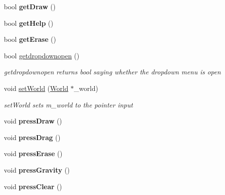 \begin{DoxyCompactItemize}
\item 
\hypertarget{classToolbar_a6a2b3c1096e6fca0096cd925ed4dc683}{bool {\bfseries get\-Draw} ()}\label{classToolbar_a6a2b3c1096e6fca0096cd925ed4dc683}

\item 
\hypertarget{classToolbar_ad857b74648d0d4f2efd6f97db0ee54bb}{bool {\bfseries get\-Help} ()}\label{classToolbar_ad857b74648d0d4f2efd6f97db0ee54bb}

\item 
\hypertarget{classToolbar_aa0f40959ba3b7aa73914493c80e8ea1c}{bool {\bfseries get\-Erase} ()}\label{classToolbar_aa0f40959ba3b7aa73914493c80e8ea1c}

\item 
bool \hyperlink{classToolbar_a999463c6c8f43502c201f36967c2dd74}{getdropdownopen} ()
\begin{DoxyCompactList}\small\item\em getdropdownopen returns bool saying whether the dropdown menu is open \end{DoxyCompactList}\item 
void \hyperlink{classToolbar_af7abc15cc148a86e52fd2b50b6486af3}{set\-World} (\hyperlink{classWorld}{World} $\ast$\-\_\-world)
\begin{DoxyCompactList}\small\item\em set\-World sets m\-\_\-world to the pointer input \end{DoxyCompactList}\item 
\hypertarget{classToolbar_a9ff9b46b71c99272a45bd867a8f67f11}{void {\bfseries press\-Draw} ()}\label{classToolbar_a9ff9b46b71c99272a45bd867a8f67f11}

\item 
\hypertarget{classToolbar_af276c240324605f344af36e09d051428}{void {\bfseries press\-Drag} ()}\label{classToolbar_af276c240324605f344af36e09d051428}

\item 
\hypertarget{classToolbar_ac5f6b68ddb0583c6cb8eeb7c0bf6f864}{void {\bfseries press\-Erase} ()}\label{classToolbar_ac5f6b68ddb0583c6cb8eeb7c0bf6f864}

\item 
\hypertarget{classToolbar_a0b5586c39a0b2994944bdcb20143ef5e}{void {\bfseries press\-Gravity} ()}\label{classToolbar_a0b5586c39a0b2994944bdcb20143ef5e}

\item 
\hypertarget{classToolbar_abb5720efecaf06bf139d45d62914b457}{void {\bfseries press\-Clear} ()}\label{classToolbar_abb5720efecaf06bf139d45d62914b457}


\end{DoxyCompactItemize}
